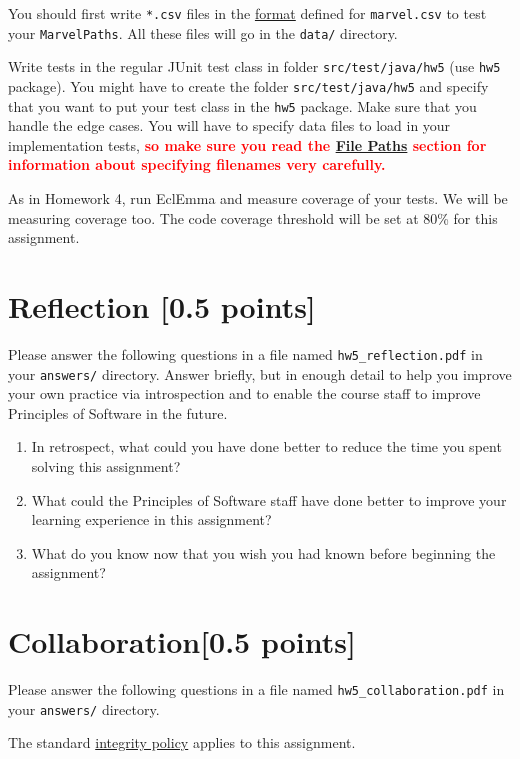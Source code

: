 \documentclass[11pt]{article}
\begin{document}
\noindent You should first write \texttt{*.csv} files in the \hyperref[sec:Problem 2]{format} defined for \texttt{marvel.csv} to test your \texttt{MarvelPaths}. All these files will go in the 
\texttt{data/} directory.

\noindent Write tests in the regular JUnit test class in folder \texttt{src/test/java/hw5} (use \texttt{hw5} package). You might have to create the folder \texttt{src/test/java/hw5} and specify that you want to put your test class in the \texttt{hw5} package. Make sure that you handle the edge cases. You will have to specify data files to load in your implementation tests, \textcolor{red}{\textbf{so make sure you read the \hyperref[sec:Paths]{File Paths} section for information about specifying filenames very carefully.}}

As in Homework 4, run EclEmma and measure coverage of your tests. We will be measuring coverage too. The code coverage threshold will be set at 80\% for this assignment.

\section*{Reflection [0.5 points]}
Please answer the following questions in a file named \texttt{hw5\_reflection.pdf} in your \texttt{answers/} directory. Answer briefly, but in enough detail to help you improve your own practice via introspection and to enable the course staff to improve Principles of Software in the future.
\begin{enumerate}
\item In retrospect, what could you have done better to reduce the time you spent solving this assignment?
\item What could the Principles of Software staff have done better to improve your learning experience in this assignment?
\item What do you know now that you wish you had known before beginning the assignment?
\end{enumerate}

\section*{Collaboration[0.5 points]}
Please answer the following questions in a file named \texttt{hw5\_collaboration.pdf} in your \texttt{answers/} directory.

\noindent The standard \href{https://www.cs.rpi.edu/academics/courses/spring23/csci2600/Documents/syllabus_CSCI_2600_Spring_2023.pdf}{integrity policy} applies to this assignment.
\end{document}
